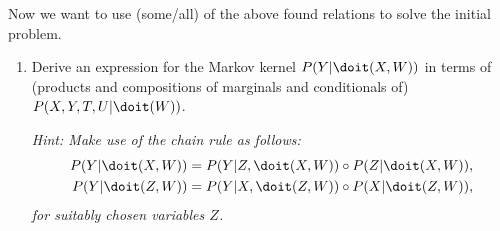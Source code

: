 Now we want to use (some/all) of the above found relations to solve the initial problem.
\begin{enumerate}[resume*]
  \item Derive an expression for the Markov kernel $P(Y|\doit(X,W))$ in terms of (products and compositions of
    marginals and conditionals of) $P(X,Y,T,U|\doit(W))$.

\emph{Hint: Make use of the chain rule as follows: 
\begin{align}
    P(Y|\doit(X,W)) &= P(Y|Z,\doit(X,W)) \circ P(Z|\doit(X,W)), \\
    P(Y|\doit(Z,W)) &= P(Y|X,\doit(Z,W)) \circ P(X|\doit(Z,W)),
\end{align}
for suitably chosen variables $Z$.
}
\end{enumerate}


